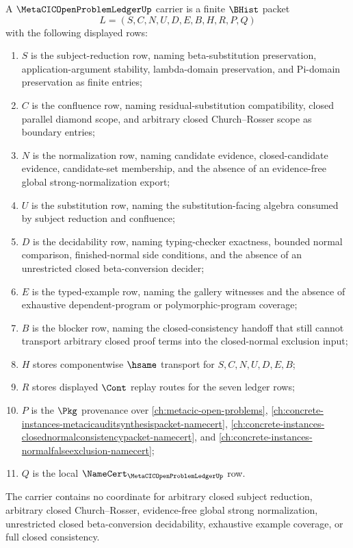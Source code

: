 \begin{definition}
\label{def:metacic-open-problem-ledger-carrier}
A $\MetaCICOpenProblemLedgerUp$ carrier is a finite $\BHist$ packet
$$
L=(S,C,N,U,D,E,B,H,R,P,Q)
$$
with the following displayed rows:
\begin{enumerate}
\item $S$ is the subject-reduction row, naming beta-substitution preservation, application-argument stability, lambda-domain preservation, and Pi-domain preservation as finite entries;
\item $C$ is the confluence row, naming residual-substitution compatibility, closed parallel diamond scope, and arbitrary closed Church--Rosser scope as boundary entries;
\item $N$ is the normalization row, naming candidate evidence, closed-candidate evidence, candidate-set membership, and the absence of an evidence-free global strong-normalization export;
\item $U$ is the substitution row, naming the substitution-facing algebra consumed by subject reduction and confluence;
\item $D$ is the decidability row, naming typing-checker exactness, bounded normal comparison, finished-normal side conditions, and the absence of an unrestricted closed beta-conversion decider;
\item $E$ is the typed-example row, naming the gallery witnesses and the absence of exhaustive dependent-program or polymorphic-program coverage;
\item $B$ is the blocker row, naming the closed-consistency handoff that still cannot transport arbitrary closed proof terms into the closed-normal exclusion input;
\item $H$ stores componentwise $\hsame$ transport for $S,C,N,U,D,E,B$;
\item $R$ stores displayed $\Cont$ replay routes for the seven ledger rows;
\item $P$ is the $\Pkg$ provenance over \autoref{ch:metacic-open-problems}, \autoref{ch:concrete-instances-metacicauditsynthesispacket-namecert}, \autoref{ch:concrete-instances-closednormalconsistencypacket-namecert}, and \autoref{ch:concrete-instances-normalfalseexclusion-namecert};
\item $Q$ is the local $\NameCert_{\MetaCICOpenProblemLedgerUp}$ row.
\end{enumerate}
The carrier contains no coordinate for arbitrary closed subject reduction, arbitrary closed Church--Rosser, evidence-free global strong normalization, unrestricted closed beta-conversion decidability, exhaustive example coverage, or full closed consistency.
\end{definition}

